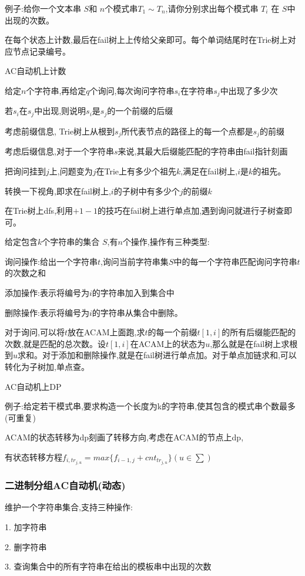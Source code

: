 \documentclass[a4paper, fontset=none]{ctexart}
\begin{document}
例子:给你一个文本串 $S$和 $n$个模式串$T_1 \sim T_n$,请你分别求出每个模式串 $T_i$ 在 $S$中出现的次数。

在每个状态上计数,最后在fail树上上传给父亲即可。每个单词结尾时在Trie树上对应节点记录编号。

AC自动机上计数

给定$n$个字符串,再给定$q$个询问,每次询问字符串$s_i$在字符串$s_j$中出现了多少次

若$s_i$在$s_j$中出现,则说明$s_i$是$s_j$的一个前缀的后缀

考虑前缀信息, Trie树上从根到$s_j$所代表节点的路径上的每一个点都是$s_j$的前缀

考虑后缀信息,对于一个字符串$s$来说,其最大后缀能匹配的字符串由fail指针刻画

把询问挂到$j$上,问题变为$j$在Trie上有多少个祖先$k$,满足在fail树上,$i$是$k$的祖先。

转换一下视角,即求在fail树上,$i$的子树中有多少个$j$的前缀$k$

在Trie树上dfs,利用$+1 -1$的技巧在fail树上进行单点加,遇到询问就进行子树查即可。

给定包含$k$个字符串的集合 $S$,有$n$个操作,操作有三种类型:

询问操作:给出一个字符串$t$,询问当前字符串集$S$中的每一个字符串匹配询问字符串$t$的次数之和

添加操作:表示将编号为$i$的字符串加入到集合中

删除操作:表示将编号为$i$的字符串从集合中删除。

对于询问,可以将$t$放在ACAM上面跑,求$t$的每一个前缀$t[1, i]$的所有后缀能匹配的次数,就是匹配的总次数。设$t[1, i]$在ACAM上的状态为$u$,那么就是在fail树上求根到$u$求和。对于添加和删除操作,就是在fail树进行单点加。对于单点加链求和,可以转化为子树加,单点查。

AC自动机上DP

例子:给定若干模式串,要求构造一个长度为k的字符串,使其包含的模式串个数最多(可重复)

ACAM的状态转移为dp刻画了转移方向,考虑在ACAM的节点上dp,

有状态转移方程$f_{i, tr_{j, u}}=max\{f_{i-1, j}+cnt_{tr_{j, u}}\}(u\in \sum)$ 
\subsubsection{二进制分组AC自动机(动态)}

维护一个字符串集合,支持三种操作:

1. 加字符串

2. 删字符串

3. 查询集合中的所有字符串在给出的模板串中出现的次数
\end{document}
